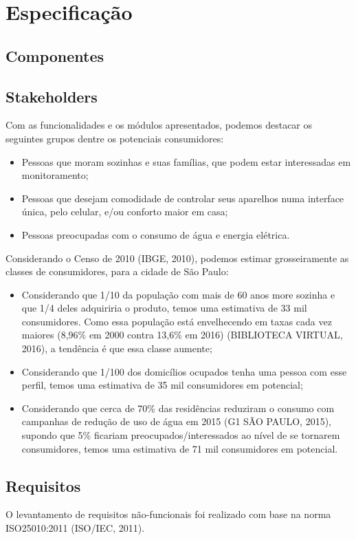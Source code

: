 \chapter{Especificação}

\section{Componentes}

\section{Stakeholders}
Com as funcionalidades e os módulos apresentados,  podemos destacar os seguintes grupos dentre os potenciais consumidores:
\begin{itemize}
\item Pessoas que moram sozinhas e suas famílias, que podem estar interessadas em monitoramento;
\item Pessoas que desejam comodidade de controlar seus aparelhos numa interface única, pelo celular, e/ou conforto maior em casa;
\item Pessoas preocupadas com o consumo de água e energia elétrica.
\end{itemize}

Considerando o Censo de 2010 (IBGE, 2010), podemos estimar grosseiramente as classes de consumidores, para a cidade de São Paulo:

\begin{itemize}
\item Considerando que 1/10 da população com mais de 60 anos more sozinha e que 1/4 deles adquiriria o produto, temos uma estimativa de 33 mil consumidores. Como essa população está envelhecendo em taxas cada vez maiores (8,96\% em 2000 contra 13,6\% em 2016) (BIBLIOTECA VIRTUAL, 2016), a tendência é que essa classe aumente;
\item Considerando que 1/100 dos domicílios ocupados tenha uma pessoa com esse perfil, temos uma estimativa de 35 mil consumidores em potencial;
\item Considerando que cerca de 70\% das residências reduziram o consumo com campanhas de redução de uso de água em 2015 (G1 SÃO PAULO, 2015), supondo que 5\% ficariam preocupados/interessados ao nível de se tornarem consumidores, temos uma estimativa de 71 mil consumidores em potencial.
\end{itemize}

\section{Requisitos}
O levantamento de requisitos não-funcionais foi realizado com base na norma ISO25010:2011 (ISO/IEC, 2011).

